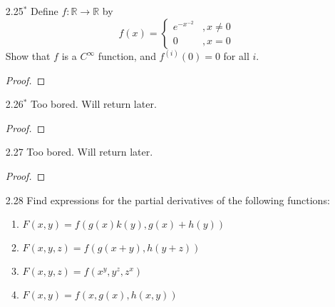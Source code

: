 \begin{enumerate}
    \begin{proof}
    \begin{enumerate}
        \item It is a simple matter to show that
        \[
        D_2f(x,0) = \lim_{h \rightarrow 0} \frac{f(x,h)-f(x,0)}{h} = x
        \]
        and
        \[
        D_1f(0,y) = \lim_{h \rightarrow 0} \frac{f(h,y)-f(0,y)}{h} = -y
        \]
        
        \item It is a simple matter to show that
        \[
        D_{1,2}f(0,0) = -1 \neq 1 = D_{2,1}f(0,0)
        \]
    \end{enumerate}
    \end{proof}

    \item[2.25\(^*\)] Define \( f:\mathbb{R} \rightarrow \mathbb{R} \) by
    \[
    f(x) = \begin{cases} e^{-x^{-2}} &, x \neq 0 \\ 0 &, x=0 \end{cases}
    \]
    Show that \( f \) is a \( C^\infty \) function, and \( f^{(i)}(0) = 0 \) for all \( i \).
    \begin{proof}
    \end{proof}
    
    \item[2.26\(^*\)] Too bored. Will return later.
    \begin{proof}
    
    \end{proof}
    \item[2.27] Too bored. Will return later.
    \begin{proof}
    
    \end{proof}
    
    \item[2.28] Find expressions for the partial derivatives of the following functions:
    \begin{enumerate}
        \item \( F(x,y) = f(g(x)k(y), g(x)+h(y)) \)
        
        \item \( F(x,y,z) = f(g(x+y), h(y+z)) \)
        
        \item \( F(x,y,z) = f(x^y, y^z, z^x) \)
        
        \item \( F(x,y) = f(x,g(x),h(x,y)) \)
    \end{enumerate}
    

\end{enumerate}
